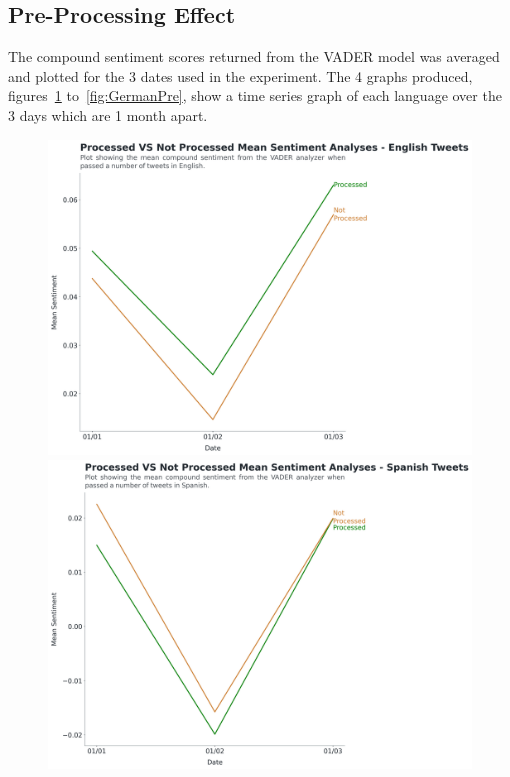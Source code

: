 \begin{landscape}
\newpage

\section{Pre-Processing Effect}

The compound sentiment scores returned from the \ac{VADER} model was averaged and plotted for the 3 dates used in the experiment.
The 4 graphs produced, figures~\ref{fig:EnglishPre} to~\ref{fig:GermanPre}, show a time series graph of each language over the 3 days which are 1 month apart.

\begin{figure}[!htb]
  \includegraphics[width=\linewidth]{English Process VS NotProcessed.png}
  \caption[English Process VS NotProcessed]{ }\label{fig:EnglishPre}
\endminipage\hfill
{}
  \includegraphics[width=\linewidth]{Spanish Process VS NotProcessed.png}

\end{figure}
\end{landscape}
